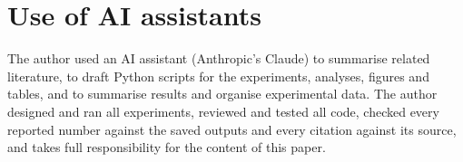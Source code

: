 \section{Use of AI assistants}\label{app:aiuse}

The author used an AI assistant (Anthropic's Claude) to summarise related literature, to draft Python scripts for
the experiments, analyses, figures and tables, and to summarise results and organise experimental data.
The author designed and ran all experiments, reviewed and tested all code, checked every reported number against the
saved outputs and every citation against its source, and takes full responsibility for the content of this paper.
